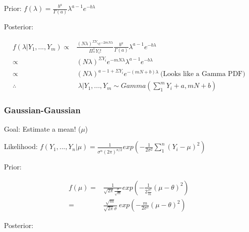 \documentclass[11pt]{article}
\begin{document}
Prior: \(f(\lambda) = \frac{b^a}{\Gamma (a)} \lambda^{a - 1} e^{-b \lambda}\)

Posterior:

\begin{equation}
\begin{split}
f(\lambda | Y_1, ..., Y_m) \propto & \frac{(N \lambda)^{\Sigma Y_i} e^{-2 m N \lambda}}{\Pi^{1}_^{m} Y_i !} \frac{b^a}{\Gamma (a)} \lambda^{a - 1} e^{-b \lambda}\\
\propto & (N \lambda)^{\Sigma Y_i} e^{- m N \lambda} \lambda^{a - 1} e^{-b \lambda}\\
\propto & (N \lambda)^{a - 1 + \Sigma Y_i} e^{- (m N + b) \lambda} \ \text{(Looks like a Gamma PDF)}\\
\therefore & \ \lambda | Y_1, ..., Y_m \sim Gamma(\sum_{1}^{m} Y_i + a, m N + b)
\end{split}
\end{equation}


\subsubsection{Gaussian-Gaussian}
\label{sec:org2c26312}

Goal: Estimate a mean! (\(\mu\))

Likelihood: \(f(Y_1, ..., Y_n | \mu) = \frac{1}{\sigma^n (2 \pi)^{n/2}}
exp(-\frac{1}{2 \sigma^2} \sum_{1}^{n} (Y_i - \mu)^2)\)

Prior:

\begin{equation}
\begin{split}
f(\mu) = & \frac{1}{\sqrt{2 \pi} \frac{\sigma}{\sqrt{m}}} exp(- \frac{1}{2 \frac{\sigma^2}{m}} (\mu - \theta)^2)\\
= & \frac{\sqrt{m}}{\sqrt{2 \pi} \sigma} \ exp(- \frac{m}{2 \sigma^2} (\mu - \theta)^2)
\end{split}
\end{equation}

Posterior:
\end{document}
